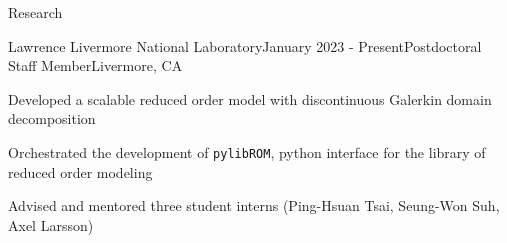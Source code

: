 \documentclass{resume} %
\begin{document}
\begin{rSection}{Research}

\begin{rSubsection}{Lawrence Livermore National Laboratory}{January 2023 - Present}{Postdoctoral Staff Member}{Livermore, CA}
\item Developed a scalable reduced order model with discontinuous Galerkin domain decomposition
\item Orchestrated the development of \texttt{pylibROM}, python interface for the library of reduced order modeling
\item Advised and mentored three student interns (Ping-Hsuan Tsai, Seung-Won Suh, Axel Larsson)
\end{rSubsection}


\end{rSection}
\end{document}
